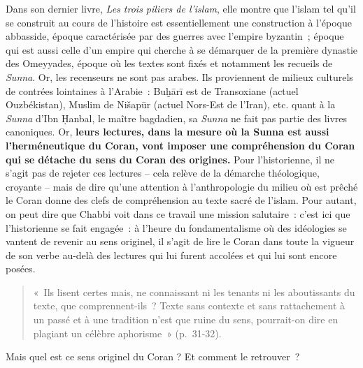 Dans son dernier livre, \emph{Les trois piliers de l'islam}, elle montre
que l'islam tel qu'il se construit au cours de l'histoire est
essentiellement une construction à l'époque abbasside, époque
caractérisée par des guerres avec l'empire byzantin~; époque qui est
aussi celle d'un empire qui cherche à se démarquer de la première
dynastie des Omeyyades, époque où les textes sont fixés et notamment les
recueils de \emph{Sunna}. Or, les recenseurs ne sont pas arabes. Ils
proviennent de milieux culturels de contrées lointaines à l'Arabie~:
Buḫārī est de Transoxiane (actuel Ouzbékistan), Muslim de Nišapūr
(actuel Nors-Est de l'Iran), etc. quant à la \emph{Sunna} d'Ibn Ḥanbal,
le maître bagdadien, sa \emph{Sunna} ne fait pas partie des livres
canoniques. Or, \textbf{leurs lectures, dans la
mesure où la Sunna est aussi l'herméneutique du Coran, vont imposer une
compréhension du Coran qui se détache du sens du Coran des origines.}
Pour l'historienne, il ne s'agit pas de rejeter ces lectures -- cela
relève de la démarche théologique, croyante -- mais de dire qu'une
attention à l'anthropologie du milieu où est prêché le Coran donne des
clefs de compréhension au texte sacré de l'islam. Pour autant, on peut
dire que Chabbi voit dans ce travail une mission salutaire~: c'est ici
que l'historienne se fait engagée~: à l'heure du fondamentalisme où des
idéologies se vantent de revenir au sens originel, il s'agit de lire le
Coran dans toute la vigueur de son verbe au-delà des lectures qui lui
furent accolées et qui lui sont encore posées.
\begin{quote}
    «~Ils lisent certes mais, ne connaissant ni les tenants ni les
aboutissants du texte, que comprennent-ils~? Texte sans contexte et sans
rattachement à un passé et à une tradition n'est que ruine du sens,
pourrait-on dire en plagiant un célèbre aphorisme~» (p.~31-32).
\end{quote}


Mais quel est ce sens originel du Coran ? Et comment le retrouver~?


